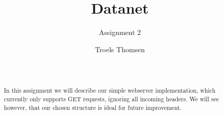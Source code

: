 \documentclass{acm_proc_article-sp}
\begin{document}
\title{Datanet}
\subtitle{Assignment 2}

%
%
%
%


\author{
%
%
\alignauthor
Troels Thomsen\\
       \\
       \\
}

\maketitle

\begin{abstract}
In this assignment we will describe our simple webserver implementation, which currently only supports GET requests, ignoring all incoming headers.
We will see however, that our chosen structure is ideal for future improvement.
\end{abstract}
\end{document}
